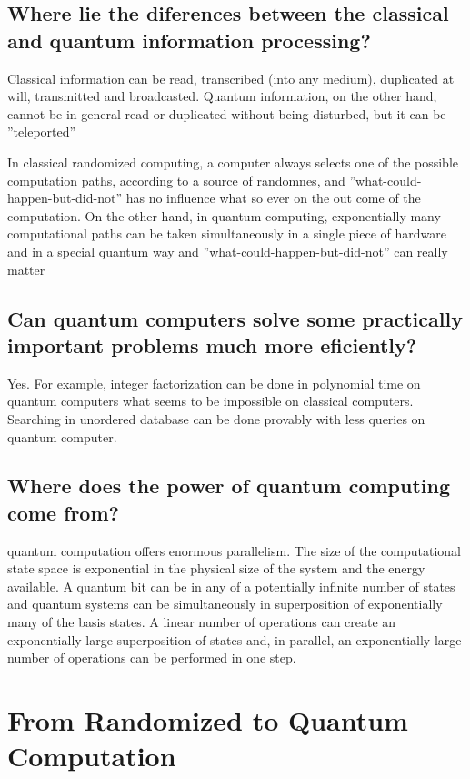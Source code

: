 \documentclass[12pt]{book}
\begin{document}
\subsection{
Where lie the diferences between the classical and quantum information processing?
}

Classical information can be read, transcribed (into any medium), duplicated at will, transmitted and broadcasted. Quantum information, on the other hand, cannot be in general
read or duplicated without being disturbed, but it can be ''teleported''

In classical randomized computing, a computer always selects one of the possible computation paths, according to a source of randomnes, and ''what-could-happen-but-did-not''
has no influence what so ever on the out come of the computation. On the other hand, in quantum computing, exponentially many computational paths can be taken simultaneously in a single piece of hardware and in a special quantum way and ''what-could-happen-but-did-not'' can really matter


\subsection{
Can quantum computers solve some practically important problems much more eficiently?
}

Yes. For example, integer factorization can be done in polynomial time on quantum computers what seems to be impossible on classical computers. Searching in unordered database can be done provably with less queries on quantum computer.


\subsection{
Where does the power of quantum computing come from?
}

quantum computation offers enormous parallelism. The size of the computational state
space is exponential in the physical size of the system and the energy available. A quantum
bit can be in any of a potentially infinite number of states and quantum systems can be
simultaneously in superposition of exponentially many of the basis states. A linear number
of operations can create an exponentially large superposition of states and, in parallel, an
exponentially large number of operations can be performed in one step.




\section{From Randomized to Quantum Computation}
\end{document}
